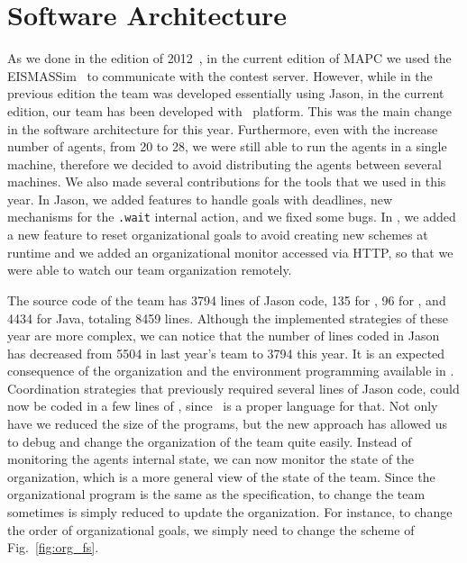 \section{Software Architecture}

As we done in the edition of 2012~\cite{smadas:2012}, in the current edition of MAPC we used the EISMASSim~\cite{behrens:2011} to communicate with the contest server. However, while in the previous edition the team was developed essentially using Jason, in the current edition, our team has been developed with \jacamo\  platform. This was the main change in the software architecture for this year. Furthermore, even with the increase number of agents, from 20 to 28, we were still able to run the agents in a single machine, therefore we decided to avoid distributing the agents between several machines. We also made several contributions for the tools that we used in this year. In Jason, we added features to handle goals with deadlines, new mechanisms for the \texttt{.wait} internal action, and we fixed some bugs. In \moise, we added a new feature to reset organizational goals to avoid creating new schemes at runtime and we added an organizational monitor accessed via HTTP, so that we were able to watch our team organization remotely.

The source code of the team has 3794 lines of Jason code, 135 for \moise, 96 for \cartago, and 4434 for Java, totaling 8459 lines. Although the implemented strategies of these year are more complex, we can notice that the number of lines coded in Jason has decreased from 5504 in last year's team to 3794 this year. It is an expected consequence of the organization and the environment programming available in \jacamo. Coordination strategies that previously required several lines of Jason code, could now be coded in a few lines of \moise, since \moise\ is a proper language for that.  Not only have we reduced the size of the programs, but the new approach has allowed us to debug and change the organization of the team quite easily. Instead of monitoring the agents internal state, we can now monitor the state of the organization, which is a more general view of the state of the team. Since the organizational program is the same as the specification, to change the team sometimes is simply reduced to update the organization. For instance, to change the order of organizational goals, we simply need to change the scheme of Fig.~\ref{fig:org_fs}.